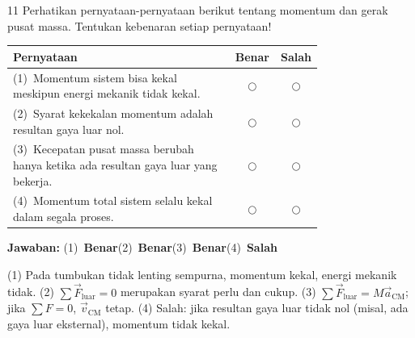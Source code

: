 \documentclass[11pt]{article}
\newcommand{\jawaban}[1]{%
  \noindent\colorbox{gold!30}{\parbox{\dimexpr\linewidth-2\fboxsep\relax}{%
    \textbf{Jawaban:} #1}}\par\smallskip}
\begin{document}
\begin{soal}{11}  %
Perhatikan pernyataan-pernyataan berikut tentang momentum dan gerak
pusat massa. Tentukan kebenaran setiap pernyataan!

\par\smallskip
{\renewcommand{\arraystretch}{1.4}%
\begin{tabular}{@{}p{0.76\linewidth}cc@{}}
\hline
\textbf{Pernyataan} & \textbf{Benar} & \textbf{Salah}\\
\hline
(1)~Momentum sistem bisa kekal meskipun energi mekanik tidak kekal.
  & $\bigcirc$ & $\bigcirc$\\
(2)~Syarat kekekalan momentum adalah resultan gaya luar nol.
  & $\bigcirc$ & $\bigcirc$\\
(3)~Kecepatan pusat massa berubah hanya ketika ada resultan gaya
    luar yang bekerja.
  & $\bigcirc$ & $\bigcirc$\\
(4)~Momentum total sistem selalu kekal dalam segala proses.
  & $\bigcirc$ & $\bigcirc$\\
\hline
\end{tabular}}
\end{soal}
\begin{pembox}
\jawaban{(1)~\textbf{Benar}\quad(2)~\textbf{Benar}\quad(3)~\textbf{Benar}\quad(4)~\textbf{Salah}}
(1) Pada tumbukan tidak lenting sempurna, momentum kekal, energi mekanik tidak.
(2) $\sum\vec{F}_{\text{luar}}=0$ merupakan syarat perlu dan cukup.
(3) $\sum\vec{F}_{\text{luar}}=M\vec{a}_{\text{CM}}$; jika $\sum F=0$, $\vec{v}_{\text{CM}}$ tetap.
(4) Salah: jika resultan gaya luar tidak nol (misal, ada gaya luar eksternal), momentum tidak kekal.
\end{pembox}
\end{document}
